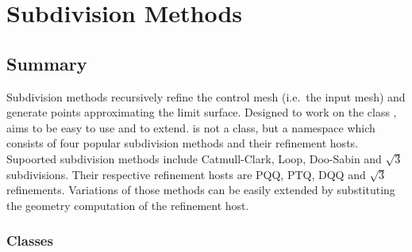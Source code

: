 
\chapter{Subdivision Methods}
\label{chapterSubdivisionRef}


\section*{Summary}

Subdivision methods recursively refine the control mesh 
(i.e.~the input mesh) and generate points approximating 
the limit surface. 
Designed to work on the class ,
 aims to be easy to use and to extend.
 is not a class, but a namespace 
which consists of four popular subdivision methods and their refinement
hosts. Supoorted subdivision methods include Catmull-Clark, Loop, 
Doo-Sabin and $\sqrt{3}$ subdivisions. Their respective refinement 
hosts are PQQ, PTQ, DQQ and $\sqrt{3}$ refinements.
Variations of those methods can be easily 
extended by substituting the geometry computation of the refinement
host.


\subsection*{Classes}

